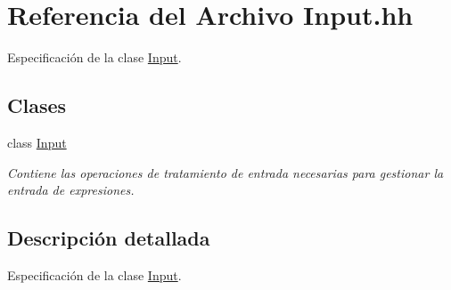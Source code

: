 \hypertarget{_input_8hh}{}\section{Referencia del Archivo Input.\+hh}
\label{_input_8hh}


Especificación de la clase \hyperlink{class_input}{Input}.  


\subsection*{Clases}
\begin{DoxyCompactItemize}
\item 
class \hyperlink{class_input}{Input}
\begin{DoxyCompactList}\small\item\em Contiene las operaciones de tratamiento de entrada necesarias para gestionar la entrada de expresiones. \end{DoxyCompactList}\end{DoxyCompactItemize}


\subsection{Descripción detallada}
Especificación de la clase \hyperlink{class_input}{Input}. 

